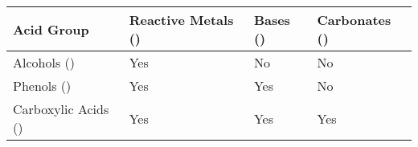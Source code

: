 		\begin{center}\begin{table}[htb]\renewcommand{\arraystretch}{1.5}
		\begin{tabu} to \textwidth {| X[-4,c,m] | X[c,m] | X[c,m] | X[c,m] |}

			\hline
						Acid Group				&	\vspace{2mm}Reactive Metals ()\vspace{2mm}	&	Bases ()	&	Carbonates ()\\	\hline
					Alcohols ()			&			Yes					&			No			&			No				\\	\hline
					Phenols ()			&			Yes					&			Yes			&			No				\\	\hline
				Carboxylic Acids ()	&			Yes					&			Yes			&			Yes				\\	\hline

		\end{tabu}
		\end{table}\end{center}\vspace{-10mm}





























